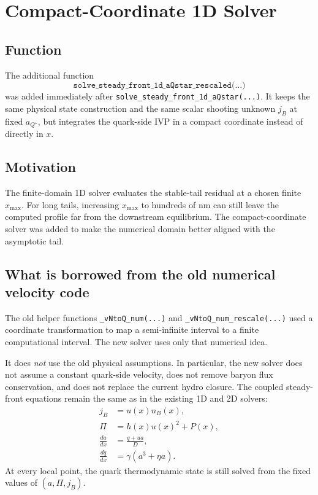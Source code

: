\documentclass[11pt]{article}
\begin{document}
\section{Compact-Coordinate 1D Solver}
\subsection{Function}
The additional function
\[
\texttt{solve\_steady\_front\_1d\_aQstar\_rescaled(...)}
\]
was added immediately after \texttt{solve\_steady\_front\_1d\_aQstar(...)}.
It keeps the same physical state construction and the same scalar shooting
unknown $j_B$ at fixed $a_{Q^\star}$, but integrates the quark-side IVP in a
compact coordinate instead of directly in $x$.

\subsection{Motivation}
The finite-domain 1D solver evaluates the stable-tail residual at a chosen
finite $x_{\max}$. For long tails, increasing $x_{\max}$ to hundreds of nm can
still leave the computed profile far from the downstream equilibrium. The
compact-coordinate solver was added to make the numerical domain better aligned
with the asymptotic tail.

\subsection{What is borrowed from the old numerical velocity code}
The old helper functions \texttt{\_vNtoQ\_num(...)} and
\texttt{\_vNtoQ\_num\_rescale(...)} used a coordinate transformation to map a
semi-infinite interval to a finite computational interval. The new solver uses
only that numerical idea.

It does \emph{not} use the old physical assumptions. In particular, the new
solver does not assume a constant quark-side velocity, does not remove baryon
flux conservation, and does not replace the current hydro closure. The coupled
steady-front equations remain the same as in the existing 1D and 2D solvers:
\begin{align}
j_B &= u(x)n_B(x),\\
\Pi &= h(x)u(x)^2 + P(x),\\
\frac{da}{dx} &= \frac{q+u a}{D},\\
\frac{dq}{dx} &= \gamma(a^3+\eta a).
\end{align}
At every local point, the quark thermodynamic state is still solved from the
fixed values of $(a,\Pi,j_B)$.
\end{document}
